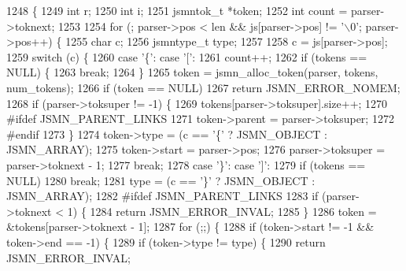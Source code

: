 \begin{DoxyCode}
1248                                                     \{
1249     \textcolor{keywordtype}{int} r;
1250     \textcolor{keywordtype}{int} i;
1251     jsmntok\_t *token;
1252     \textcolor{keywordtype}{int} count = parser->toknext;
1253 
1254     \textcolor{keywordflow}{for} (; parser->pos < len && js[parser->pos] != \textcolor{charliteral}{'\(\backslash\)0'}; parser->pos++) \{
1255         \textcolor{keywordtype}{char} c;
1256         jsmntype_t type;
1257 
1258         c = js[parser->pos];
1259         \textcolor{keywordflow}{switch} (c) \{
1260             \textcolor{keywordflow}{case} \textcolor{charliteral}{'\{'}: \textcolor{keywordflow}{case} \textcolor{charliteral}{'['}:
1261                 count++;
1262                 \textcolor{keywordflow}{if} (tokens == NULL) \{
1263                     \textcolor{keywordflow}{break};
1264                 \}
1265                 token = jsmn_alloc_token(parser, tokens, num\_tokens);
1266                 \textcolor{keywordflow}{if} (token == NULL)
1267                     \textcolor{keywordflow}{return} JSMN_ERROR_NOMEM;
1268                 \textcolor{keywordflow}{if} (parser->toksuper != -1) \{
1269                     tokens[parser->toksuper].size++;
1270 \textcolor{preprocessor}{#ifdef JSMN\_PARENT\_LINKS}
1271                     token->parent = parser->toksuper;
1272 \textcolor{preprocessor}{#endif}
1273                 \}
1274                 token->type = (c == \textcolor{charliteral}{'\{'} ? JSMN_OBJECT : JSMN_ARRAY);
1275                 token->start = parser->pos;
1276                 parser->toksuper = parser->toknext - 1;
1277                 \textcolor{keywordflow}{break};
1278             \textcolor{keywordflow}{case} \textcolor{charliteral}{'\}'}: \textcolor{keywordflow}{case} \textcolor{charliteral}{']'}:
1279                 \textcolor{keywordflow}{if} (tokens == NULL)
1280                     \textcolor{keywordflow}{break};
1281                 type = (c == \textcolor{charliteral}{'\}'} ? JSMN_OBJECT : JSMN_ARRAY);
1282 \textcolor{preprocessor}{#ifdef JSMN\_PARENT\_LINKS}
1283                 \textcolor{keywordflow}{if} (parser->toknext < 1) \{
1284                     \textcolor{keywordflow}{return} JSMN_ERROR_INVAL;
1285                 \}
1286                 token = &tokens[parser->toknext - 1];
1287                 \textcolor{keywordflow}{for} (;;) \{
1288                     \textcolor{keywordflow}{if} (token->start != -1 && token->end == -1) \{
1289                         \textcolor{keywordflow}{if} (token->type != type) \{
1290                             \textcolor{keywordflow}{return} JSMN_ERROR_INVAL;

\end{DoxyCode}

